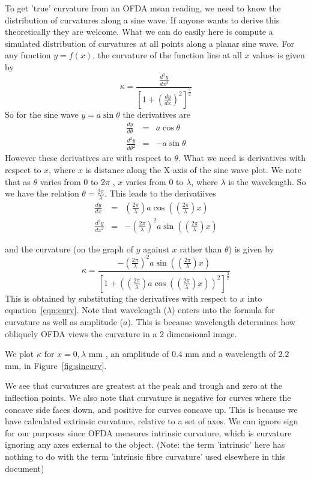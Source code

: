 \documentclass[titlepage,10pt]{article}  %
\begin{document}
To get 'true' curvature from an OFDA mean reading, we need to know the distribution of curvatures along a sine wave. If anyone wants to derive this theoretically they are welcome.  
 What we can do easily here is compute a simulated distribution of curvatures at all points along a planar sine wave. 
For any function $y = f(x)$, the curvature of the function line at all $x$ values is given by
\begin{equation}
\label{eqn:curv}
\kappa = \frac{ \frac{d^{2}y}{dx^{2}} } {[1 + (\frac{dy}{dx})^{2}]^{\frac{3}{2}}}
\end{equation}
So for the sine wave $y = a \sin{\theta}$ the derivatives are
\begin{eqnarray*}
\frac{dy}{d\theta} & = & a \cos{\theta} \\
\frac{d^{2}y}{d\theta^{2}} & = & -a \sin{\theta}
\end{eqnarray*}
However these derivatives are with respect to $\theta$.  What we need is derivatives with respect to $x$, where $x$ is distance along the X-axis of the sine wave plot. We note that as $\theta$ varies from $0$ to $ 2\pi$ , $x$ varies from $0$ to $\lambda$, where $\lambda$ is the wavelength. So we have the relation $\theta = \frac{2 \pi}{\lambda}$. This leads to the derivatiives 
\begin{eqnarray*}
\frac{dy}{dx} & = & \left(\frac{2 \pi}{\lambda}\right) a \cos{\left(\left(\frac{2 \pi}{\lambda}\right) x \right) } \\
\frac{d^{2}y}{dx^{2}} & = & -\left(\frac{2 \pi}{\lambda}\right)^{2} a  \sin{\left(\left(\frac{2 \pi}{\lambda}\right) x \right) }
\end{eqnarray*}

and the curvature (on the graph of $y$ against $x$ rather than $\theta$) is given by
\begin{equation}
\kappa = \frac{-\left(\frac{2 \pi}{\lambda}\right)^{2} a  \sin{\left(\left(\frac{2 \pi}{\lambda}\right) x \right) }}{[1 + (\left(\frac{2 \pi}{\lambda}\right) a \cos{\left(\left(\frac{2 \pi}{\lambda}\right) x\right) })^{2}]^{\frac{3}{2}}}
\end{equation}
This is obtained by substituting the derivatives with respect to $x$ into equation~\ref{eqn:curv}.
Note that wavelength ($\lambda$) enters into the formula for curvature as well as amplitude ($a$). This is because wavelength determines how obliquely OFDA views the curvature in a 2 dimensional image.

We plot $\kappa$ for $x= 0,\lambda$ mm  , an amplitude of $0.4$ mm and a wavelength of $2.2$ mm, in Figure~\ref{fig:sincurv}.

We see that curvatures are greatest at the peak and trough and zero at the inflection points. We also note that curvature is negative for curves where the concave side faces down, and positive for curves concave up. This is because we have calculated extrinsic curvature, relative to a set of axes. We can ignore sign for our purposes since OFDA measures intrinsic curvature, which is curvature ignoring any axes external to the object. (Note: the term 'intrinsic' here has nothing to do with the term 'intrinsic fibre curvature' used elsewhere in this document)
\end{document}
